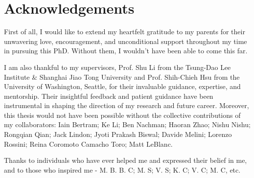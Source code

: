 \documentclass[UTF8,12pt]{ctexart}
\numberwithin{equation}{section}
\begin{document}
\newpage
{}
\section{Acknowledgements}
First of all, I would like to extend my heartfelt gratitude to my parents for their unwavering love, encouragement, and unconditional support throughout my time in pursuing this PhD. Without them, I wouldn't have been able to come this far. 

I am also thankful to my supervisors, Prof. Shu Li from the Tsung-Dao Lee Institute \& Shanghai Jiao Tong University and Prof. Shih-Chieh Hsu from the University of Washington, Seattle, for their invaluable guidance, expertise, and mentorship. Their insightful feedback and patient guidance have been instrumental in shaping the direction of my research and future career. Moreover, this thesis would not have been possible without the collective contributions of my collaborators: Iain Bertram; Ke Li; Ben Nachman; Haoran Zhao; Nishu Nishu; Rongqian Qian; Jack Lindon;  Jyoti Prakash Biswal; Davide Melini; Lorenzo Rossini; Reina Coromoto Camacho Toro; Matt LeBlanc.

Thanks to individuals who have ever helped me and expressed their belief in me, and to those who inspired me - M. B. B. C; M. S; V. S; K. C; V. C; M. C, etc.
\end{document}
